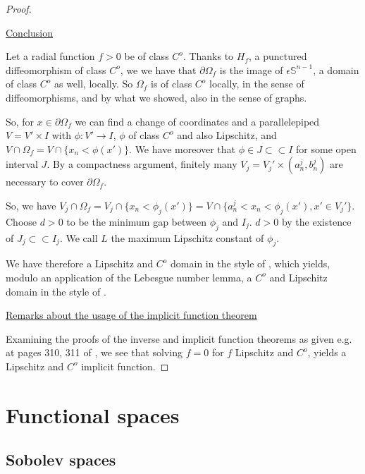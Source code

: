 \documentclass[english,a4paper,12pt,oneside]{scrbook}
\theoremstyle{break}
\newenvironment{mproof}[1][\proofname]{%
  \begin{proof}[#1]$ $\par\nobreak\ignorespaces
}{%
  \end{proof}
}
\renewcommand*{\proofname}{Proof}
\theoremstyle{remark}
\newcommand{\mS}{\mathbb{S}^{n-1}}
\newcommand{\cc}{\subset\subset}
\newcommand{\eps}{\epsilon}
\begin{document}
\begin{mproof}
\underline{Conclusion}

Let a radial function $f>0$ be of class $C^o$. Thanks to $H_f$, a punctured diffeomorphism of class $C^o$, we we have that $\partial \Omega_f$ is the image of $\eps\mS$, a domain of class $C^o$ as well, locally. So $\Omega_f $ is of class $C^o$ locally, in the sense of diffeomorphisms, and by what we showed, also in the sense of graphs.

So, for $x \in \partial \Omega_f$ we can find a change of coordinates and a parallelepiped $V = V'\times I$ with $\phi: V'\rightarrow I$, $\phi$ of class $C^o$ and also Lipschitz, and $V\cap 	\Omega_f = V\cap \{x_n<\phi(x')\}$. We have moreover that $\phi \in J \cc I$ for some open interval $J$. By a compactness argument, finitely many $V_j = V_j'\times (a_n^j, b_n^j) $ are necessary to cover $\partial \Omega_f$. 

So, we have $V_j \cap \Omega_f = V_j\cap \{x_n<\phi_j(x')\} = V\cap \{a_n^j<x_n<\phi_j(x'), x' \in V_j'\}$. Choose $d>0$ to be the minimum gap between $\phi_j$ and $I_j$. $d>0$ by the existence of $J_j \cc I_j$. We call $L$ the maximum Lipschitz constant of $\phi_j$. 

We have therefore a Lipschitz and $C^o$ domain in the style of \cite{burenkov}, which yields, modulo an application of the Lebesgue number lemma, a $C^o$ and Lipschitz domain in the style of \cite{grisvard}.

\underline{Remarks about the usage of the implicit function theorem}

Examining the proofs of the inverse and implicit function theorems as given e.g. at pages 310, 311 of \cite{gilardi2}, we see that solving $f=0$ for $f$ Lipschitz and $C^o$, yields a Lipschitz and $C^o$ implicit function.

\end{mproof}

\appendix

\chapter{Functional spaces}
\section{Sobolev spaces}
\end{document}
